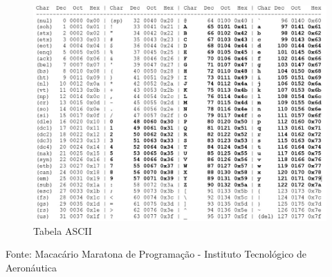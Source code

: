 \newpage
\begin{figure}[H]
    \caption{Tabela ASCII} 
    \vspace{0.5cm}
    \vspace{\belowcaptionskip}
    \centering
    \includegraphics[scale = 0.5]{image/ascii.jpg}
    \par\medskip
    \label{fig:ascii}
\end{figure}
\vspace{-1cm}
\begin{center}
    Fonte: Macacário Maratona de Programação - Instituto Tecnológico de Aeronáutica
\end{center}